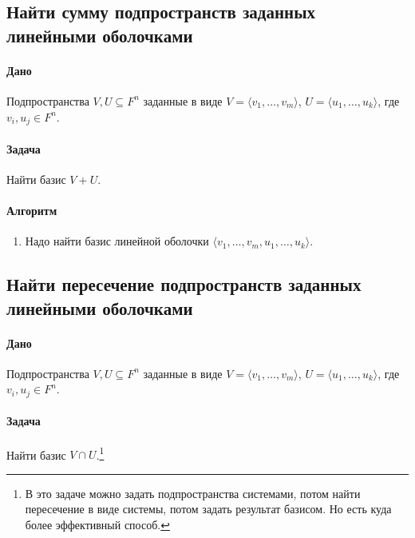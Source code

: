 \documentclass{article}
\begin{document}
\subsection{Найти сумму подпространств заданных линейными оболочками}

\paragraph{Дано} Подпространства $V,U\subseteq F^{n}$ заданные в виде $V = \langle v_1,\ldots,v_m\rangle$, $U = \langle u_1,\ldots,u_k\rangle$, где $v_i,u_j\in F^{n}$.

\paragraph{Задача} Найти базис $V + U$.

\paragraph{Алгоритм}
\begin{enumerate}
\item Надо найти базис линейной оболочки $\langle v_1,\ldots,v_m,u_1,\ldots,u_k\rangle$.
\end{enumerate}

\subsection{Найти пересечение подпространств заданных линейными оболочками}

\paragraph{Дано} Подпространства $V,U\subseteq F^{n}$ заданные в виде $V = \langle v_1,\ldots,v_m\rangle$, $U = \langle u_1,\ldots,u_k\rangle$, где $v_i,u_j\in F^{n}$.

\paragraph{Задача} Найти базис $V\cap U$.\footnote{В это задаче можно задать подпространства системами, потом найти пересечение в виде системы, потом задать результат базисом. Но есть куда более эффективный способ.}
\end{document}
